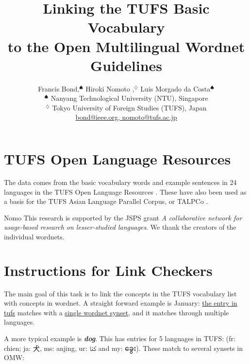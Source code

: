\documentclass[11pt]{article}
\title{Linking the TUFS Basic Vocabulary \\ to the Open Multilingual
  Wordnet \\ Guidelines}
\author{
	Francis Bond,$^\spadesuit$ 
	Hiroki Nomoto ,$^\diamondsuit$
	Luis Morgado da Costa$^\spadesuit$\\
  $^\spadesuit$ Nanyang Technological University (NTU),  Singapore\\
  $^\diamondsuit$
  Tokyo University of Foreign Studies (TUFS), Japan \\
  \url{bond@ieee.org, nomoto@tufs.ac.jp} }
\date{}
\newcommand{\myanmar}[1]{{\myanmarfont #1}}
\newcommand{\lex}[1]{\textbf{\textit{#1}}}
\begin{document}
\maketitle



\section{TUFS Open Language Resources}


The data comes from the basic vocabulary words and example sentences
in 24 languages in the TUFS Open Language Resources
\citep{Kawaguchi:2007}.  These have also been used as a basis for the TUFS Asian Language
Parallel Corpus, or TALPCo \citep{}.

Nomo
This research is supported by the JSPS grant \textit{A collaborative
  network for usage-based research on lesser-studied languages}.  We
thank the creators of the individual wordnets.

\clearpage
\onecolumn
\section{Instructions for Link Checkers}

The main goal of this task is to link the concepts in the TUFS
vocabulary list with concepts in wordnet.  A straight forward example
is January: \href{14674}{the entry in tufs} matches with a
\href{http://compling.hss.ntu.edu.sg/omw/cgi-bin/wn-gridx.cgi?usrname=&gridmode=grid&synset=15210045-n&lang=eng&lang2=eng}{single
  wordnet synset}, and it matches through multiple languages.

A more typical example is \lex{dog}.  This has entries for 5 languages
in TUFS: (fr: chien; ja: 犬, ms: anjing, ur: \texturdu{کتا} and my: \myanmar{ခွေး}).  
These match to several synsets in OMW: 
\end{document}
